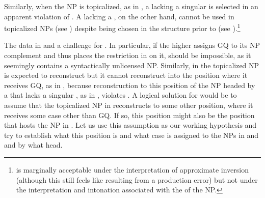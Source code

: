 \documentclass[output=paper,modfonts,newtxmath,hidelinks]{langscibook}
\begin{document}
\noindent Similarly, when the NP is topicalized, as in , a  lacking a singular  is selected in an apparent violation of . A  lacking a  , on the other hand, cannot be used in topicalized NPs (see ) despite being chosen in the structure prior to  (see ).\footnote{\label{18:fn8} is marginally acceptable under the interpretation of approximate inversion (although this  still feels like resulting from a production error) but not under the interpretation and intonation associated with the  of the NP.}

\ea \label{18:ex10}
	\z
\z

\noindent The data in  and   a challenge for . In particular, if the higher  assigns GQ to its NP complement and thus places the restriction in  on it,  should be impossible, as it seemingly contains a syntactically unlicensed NP. Similarly, in  the topicalized NP is expected to reconstruct but it cannot reconstruct into the position where it receives GQ, as in , because reconstruction to this position of the NP headed by a  that lacks a singular , as in , violates . A logical solution for  would be to assume that the topicalized NP in  reconstructs to some other position, where it receives some case other than GQ. If so, this position might also be the position that hosts the NP in . Let us use this assumption as our working hypothesis and try to establish what this position is and what case is assigned to the NPs in  and  and by what head. 
\end{document}
